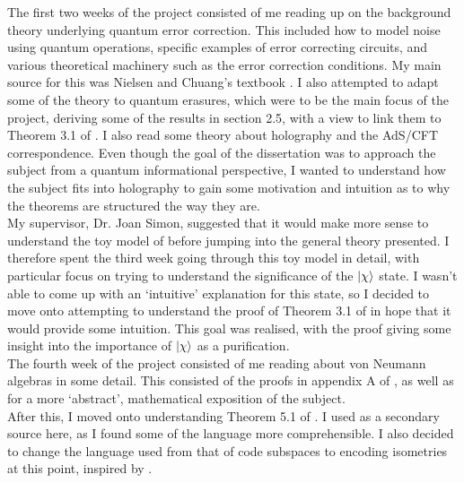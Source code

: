 \documentclass[12pt,a4paper]{report}
\numberwithin{equation}{section}
\theoremstyle{definition}
\theoremstyle{theorem}
\theoremstyle{theorem}
\theoremstyle{example}
\theoremstyle{definition}
\begin{document}
The first two weeks of the project consisted of me reading up on the background theory underlying quantum error correction. This included how to model noise using quantum operations, specific examples of error correcting circuits, and various theoretical machinery such as the error correction conditions. My main source for this was Nielsen and Chuang's textbook \cite{NielsenChuang}. I also attempted to adapt some of the theory to quantum erasures, which were to be the main focus of the project, deriving some of the results in section 2.5, with a view to link them to Theorem 3.1 of \cite{Harlow}. I also read some theory about holography and the AdS/CFT correspondence. Even though the goal of the dissertation was to approach the subject from a quantum informational perspective, I wanted to understand how the subject fits into holography to gain some motivation and intuition as to why the theorems are structured the way they are.\\
My supervisor, Dr. Joan Simon, suggested that it would make more sense to understand the toy model of \cite{Harlow} before jumping into the general theory presented. I therefore spent the third week going through this toy model in detail, with particular focus on trying to understand the significance of the $\ket{\chi}$ state. I wasn't able to come up with an `intuitive' explanation for this state, so I decided to move onto attempting to understand the proof of Theorem 3.1 of \cite{Harlow} in hope that it would provide some intuition. This goal was realised, with the proof giving some insight into the importance of $\ket{\chi}$ as a purification.\\
The fourth week of the project consisted of me reading about von Neumann algebras in some detail. This consisted of the proofs in appendix A of \cite{Harlow}, as well as \cite{VNA} for a more `abstract', mathematical exposition of the subject.\\
After this, I moved onto understanding Theorem 5.1 of \cite{Harlow}. I used \cite{Pollack} as a secondary source here, as I found some of the language more comprehensible. I also decided to change the language used from that of code subspaces to encoding isometries at this point, inspired by \cite{Pollack}.\\
\end{document}
